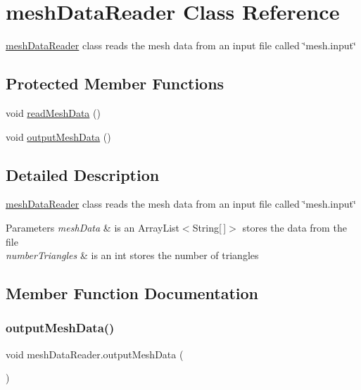 \hypertarget{classmesh_data_reader}{}\section{mesh\+Data\+Reader Class Reference}
\label{classmesh_data_reader}


\mbox{\hyperlink{classmesh_data_reader}{mesh\+Data\+Reader}} class reads the mesh data from an input file called \char`\"{}mesh.\+input\char`\"{}  


\subsection*{Protected Member Functions}
\begin{DoxyCompactItemize}
\item 
void \mbox{\hyperlink{classmesh_data_reader_af7d1b69f3af0f19eff7405dc5151bc01}{read\+Mesh\+Data}} ()
\item 
void \mbox{\hyperlink{classmesh_data_reader_aa4052bad9e3de060a1bd8bec77253025}{output\+Mesh\+Data}} ()
\end{DoxyCompactItemize}


\subsection{Detailed Description}
\mbox{\hyperlink{classmesh_data_reader}{mesh\+Data\+Reader}} class reads the mesh data from an input file called \char`\"{}mesh.\+input\char`\"{} 


\begin{DoxyParams}{Parameters}
{\em mesh\+Data} & is an Array\+List$<$\+String\mbox{[}$\,$\mbox{]}$>$ stores the data from the file \\
\hline
{\em number\+Triangles} & is an int stores the number of triangles \\
\hline
\end{DoxyParams}


\subsection{Member Function Documentation}
\mbox{\label{classmesh_data_reader_aa4052bad9e3de060a1bd8bec77253025}} 
\subsubsection{\texorpdfstring{output\+Mesh\+Data()}{outputMeshData()}}
{\footnotesize\ttfamily void mesh\+Data\+Reader.\+output\+Mesh\+Data (\begin{DoxyParamCaption}{ }\end{DoxyParamCaption})\hspace{0.3cm}{\ttfamily [protected]}}

